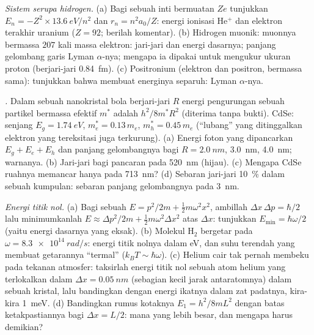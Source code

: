 \begin{exercise}[$\star\star\star$]\label{exo:b1:quantum-introduction:10}
\emph{Sistem serupa hidrogen.} (a) Bagi sebuah inti bermuatan $Ze$ tunjukkan
$E_n = -Z^2 \times \qty{13.6}{eV}/n^2$ dan $r_n = n^2a_0/Z$: energi ionisasi
He$^+$ dan elektron terakhir uranium ($Z = 92$; berilah komentar).
(b) Hidrogen muonik: muonnya bermassa $207$ kali massa elektron:
jari-jari dan energi dasarnya; panjang gelombang garis Lyman $\alpha$-nya; mengapa ia
dipakai untuk mengukur ukuran proton (berjari-jari \qty{0.84}{fm}).
(c) Positronium (elektron dan positron, bermassa sama): tunjukkan bahwa
 membuat energinya separuh: Lyman $\alpha$-nya.
\end{exercise}

\begin{exercise}[$\star\star\star$]\label{exo:b1:quantum-introduction:11}
\emph{.} Dalam sebuah nanokristal bola berjari-jari $R$
energi pengurungan sebuah partikel bermassa efektif $m^\ast$ adalah
$h^2/8m^\ast R^2$ (diterima tanpa bukti). CdSe: senjang $E_g = \qty{1.74}{eV}$, $m_e^\ast =
0.13\,m_e$, $m_h^\ast = 0.45\,m_e$ (``lubang'' yang ditinggalkan elektron yang tereksitasi
juga terkurung). (a) Energi foton yang dipancarkan $E_g + E_e + E_h$
dan panjang gelombangnya bagi $R = \qty{2.0}{nm}$, \qty{3.0}{nm}, \qty{4.0}{nm}; warnanya.
(b) Jari-jari bagi pancaran pada \qty{520}{nm} (hijau). (c) Mengapa CdSe ruahnya
memancar hanya pada \qty{713}{nm}? (d) Sebaran jari-jari \qty{10}{\percent} dalam sebuah
kumpulan: sebaran panjang gelombangnya pada \qty{3}{nm}.
\end{exercise}

\begin{exercise}[$\star\star\star$]\label{exo:b1:quantum-introduction:12}
\emph{Energi titik nol.} (a) Bagi sebuah  $E = p^2/2m +
\tfrac12m\omega^2x^2$, ambillah $\Delta x\,\Delta p = \hbar/2$ lalu minimumkanlah $E \approx
\Delta p^2/2m + \tfrac12m\omega^2\Delta x^2$ atas $\Delta x$: tunjukkan $E_{\min} = \hbar\omega/2$
(yaitu energi dasarnya yang eksak). (b) Molekul H$_2$ bergetar pada $\omega =
\qty{8.3e14}{rad/s}$: energi titik nolnya dalam eV, dan suhu
terendah yang membuat getarannya ``termal'' ($k_BT \sim \hbar\omega$).
(c) Helium cair tak pernah membeku pada tekanan atmosfer: taksirlah
energi titik nol sebuah atom helium yang terlokalkan dalam $\Delta x = \qty{0.05}{nm}$
(sebagian kecil jarak antaratomnya) dalam sebuah kristal, lalu bandingkan dengan
energi ikatnya dalam zat padatnya, kira-kira \qty{1}{meV}. (d) Bandingkan rumus kotaknya $E_1 = h^2/8mL^2$ dengan
batas ketakpastiannya bagi $\Delta x = L/2$: mana yang lebih besar, dan mengapa harus demikian?
\end{exercise}

